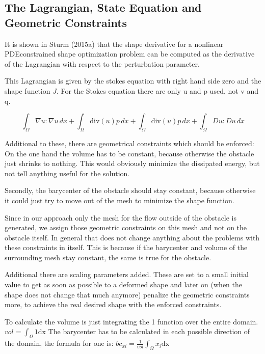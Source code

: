 \subsection{The Lagrangian, State Equation and Geometric Constraints}

It is shown in Sturm (2015a) that the shape derivative for a nonlinear PDEconstrained shape optimization problem can be computed as the derivative of the Lagrangian with respect to the perturbation parameter.\cite{fully_semi_paper_sturm}

This Lagrangian is given by the stokes equation with right hand side zero and the shape function $J$.
For the Stokes equation there are only u and p used, not v and q.

\begin{equation}\label{eq:lagrangian_basic}
    \int_{\Omega} \nabla u : \nabla u \, dx + \int_{\Omega} \mathrm{div}(u)p \, dx + \int_{\Omega} \mathrm{div}(u)p \, dx + \int_{\Omega} Du : Du \, dx
\end{equation}

Additional to these, there are geometrical constraints which should be enforced: On the one hand the volume has to be constant, because otherwise the obstacle just shrinks to nothing. This would obviously minimize the dissipated energy, but not tell anything useful for the solution.

Secondly, the barycenter of the obstacle should stay constant, because otherwise it could just try to move out of the mesh to minimize the shape function.

Since in our approach only the mesh for the flow outside of the obstacle is generated, we assign those geometric constraints on this mesh and not on the obstacle itself. In general that does not change anything about the problems with these constraints in itself. This is because if the barycenter and volume of the surrounding mesh stay constant, the same is true for the obstacle.

Additional there are scaling parameters added. These are set to a small initial value to get as soon as possible to a deformed shape and later on (when the shape does not change that much anymore) penalize the geometric constraints more, to achieve the real desired shape with the enforced constraints.

To calculate the volume is just integrating the 1 function over the entire domain. $vol = \int_\Omega 1 \mathrm{dx}$
The barycenter has to be calculated in each possible direction of the domain, the formula for one is: $bc_{xi} = \frac{1}{vol}\int_\Omega x_i \mathrm{dx}$

